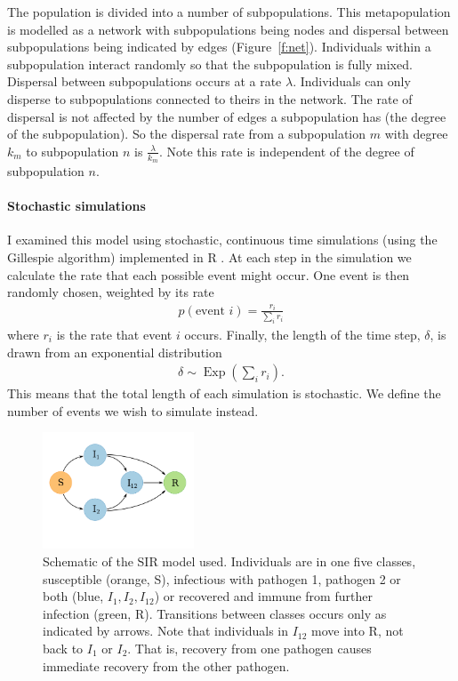 The population is divided into a number of subpopulations.
This metapopulation is modelled as a network with subpopulations being nodes and dispersal between subpopulations being indicated by edges (Figure~\ref{f:net}).
Individuals within a subpopulation interact randomly so that the subpopulation is fully mixed.
Dispersal between subpopulations occurs at a rate $\lambda$.
Individuals can only disperse to subpopulations connected to theirs in the network.
The rate of dispersal is not affected by the number of edges a subpopulation has (the degree of the subpopulation).
So the dispersal rate from a subpopulation $m$ with degree $k_m$ to subpopulation $n$ is $\frac{\lambda}{k_m}$.
Note this rate is independent of the degree of subpopulation $n$.





\paragraph{Stochastic simulations}

I examined this model using stochastic, continuous time simulations (using the Gillespie algorithm) implemented in R \cite{R}.
At each step in the simulation we calculate the rate that each possible event might occur.
One event is then randomly chosen, weighted by its rate
\begin{align}
  p(\text{event } i) = \frac{r_i}{\sum_i r_i}
\end{align}
where $r_i$ is the rate that event $i$ occurs.
Finally, the length of the time step, $\delta$, is drawn from an exponential distribution 
\begin{align}
  \delta \sim \operatorname{Exp}\left(\sum_i r_i  \right).
\end{align}
This means that the total length of each simulation is stochastic. 
We define the number of events we wish to simulate instead.


\begin{figure}[t]
\centering
  \includegraphics[width=0.4\textwidth]{imgs/SIRoption1.pdf}
  \caption[Schematic of the SIR model used]{
Schematic of the SIR model used. 
Individuals are in one five classes, susceptible (orange, S), infectious with pathogen 1, pathogen 2 or both (blue, $I_1, I_2, I_{12}$) or recovered and immune from further infection (green, R).
Transitions between classes occurs only as indicated by arrows.
Note that individuals in $I_{12}$ move into R, not back to $I_1$ or $I_2$. 
That is, recovery from one pathogen causes immediate recovery from the other pathogen.
}
  \label{f:sir}
\end{figure}


